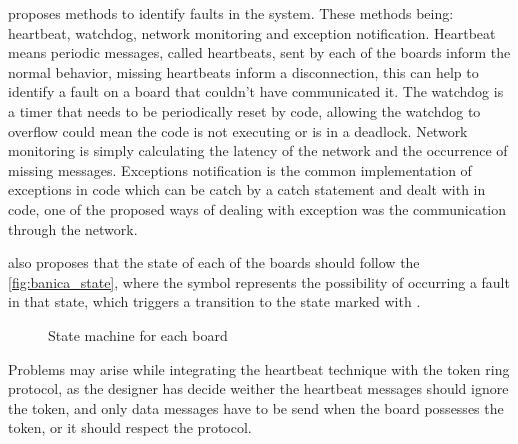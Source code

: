 \textcite{benica_design_2024} proposes methods to identify faults in the system. These methods being: heartbeat, watchdog, network monitoring and exception notification. Heartbeat means periodic messages, called heartbeats, sent by each of the boards inform the normal behavior, missing heartbeats inform a disconnection, this can help to identify a fault on a board that couldn't have communicated it. The watchdog is a timer that needs to be periodically reset by code, allowing the watchdog to overflow could mean the code is not executing or is in a deadlock. Network monitoring is simply calculating the latency of the network and the occurrence of missing messages. Exceptions notification is the common implementation of exceptions in code which can be catch by a catch statement and dealt with in code, one of the proposed ways of dealing with exception was the communication through the network.

\textcite{benica_design_2024} also proposes that the state of each of the boards should follow the \autoref{fig:banica_state}, where the  symbol represents the possibility of occurring a fault in that state, which triggers a transition to the state marked with .

\begin{figure}[!htb]
    \centering
    \caption{\label{fig:banica_state} State machine for each board}
    
\end{figure}

Problems may arise while integrating the heartbeat technique 
with the token ring protocol, as the designer has decide weither the heartbeat messages should ignore the token, and only data messages have to be send when the board possesses the token, or it should respect the protocol.




